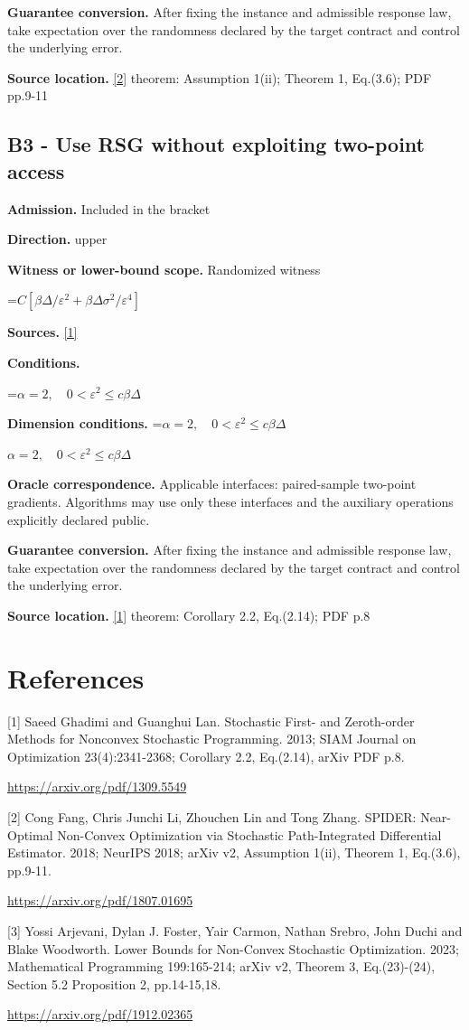 \documentclass[10pt,a4paper]{article}
\newcommand{\AtlasMath}[1]{\par\begingroup\centering\setbox0=\hbox{$\displaystyle #1$}\ifdim\wd0>1.4\linewidth\typeout{ATLAS WIDE FORMULA: \the\wd0}\fi\ifdim\wd0>\linewidth\resizebox{\linewidth}{!}{\box0}\else\box0\fi\par\endgroup}
\newcommand{\AtlasInlineMath}[1]{\begingroup\setbox0=\hbox{$#1$}\ifdim\wd0>.4\linewidth\endgroup\AtlasMath{#1}\else\endgroup$#1$\fi}
\begin{document}
\textbf{Guarantee conversion.} After fixing the instance and admissible response law, take expectation over the randomness declared by the target contract and control the underlying error.

\textbf{Source location.} \href{https://arxiv.org/pdf/1807.01695}{[2]} theorem: Assumption 1(ii); Theorem 1, Eq.(3.6); PDF pp.9-11

\subsection{B3 - Use RSG without exploiting two-point access}
\textbf{Admission.} Included in the bracket

\textbf{Direction.} upper

\textbf{Witness or lower-bound scope.} Randomized witness

\AtlasMath{C[\beta\Delta/\varepsilon^2+\beta\Delta\sigma^2/\varepsilon^4]}
\textbf{Sources.} \href{https://arxiv.org/pdf/1309.5549}{[1]}

\textbf{Conditions.} 
\AtlasMath{\alpha=2,\quad0<\varepsilon^2\le c\beta\Delta}


\textbf{Dimension conditions.} \AtlasInlineMath{\alpha=2,\quad0<\varepsilon^2\le c\beta\Delta}

\textbf{Oracle correspondence.} Applicable interfaces: paired-sample two-point gradients. Algorithms may use only these interfaces and the auxiliary operations explicitly declared public.

\textbf{Guarantee conversion.} After fixing the instance and admissible response law, take expectation over the randomness declared by the target contract and control the underlying error.

\textbf{Source location.} \href{https://arxiv.org/pdf/1309.5549}{[1]} theorem: Corollary 2.2, Eq.(2.14); PDF p.8

\section{References}
[1] Saeed Ghadimi and Guanghui Lan. Stochastic First- and Zeroth-order Methods for Nonconvex Stochastic Programming. 2013; SIAM Journal on Optimization 23(4):2341-2368; Corollary 2.2, Eq.(2.14), arXiv PDF p.8.

\url{https://arxiv.org/pdf/1309.5549}

[2] Cong Fang, Chris Junchi Li, Zhouchen Lin and Tong Zhang. SPIDER: Near-Optimal Non-Convex Optimization via Stochastic Path-Integrated Differential Estimator. 2018; NeurIPS 2018; arXiv v2, Assumption 1(ii), Theorem 1, Eq.(3.6), pp.9-11.

\url{https://arxiv.org/pdf/1807.01695}

[3] Yossi Arjevani, Dylan J. Foster, Yair Carmon, Nathan Srebro, John Duchi and Blake Woodworth. Lower Bounds for Non-Convex Stochastic Optimization. 2023; Mathematical Programming 199:165-214; arXiv v2, Theorem 3, Eq.(23)-(24), Section 5.2 Proposition 2, pp.14-15,18.

\url{https://arxiv.org/pdf/1912.02365}
\end{document}
